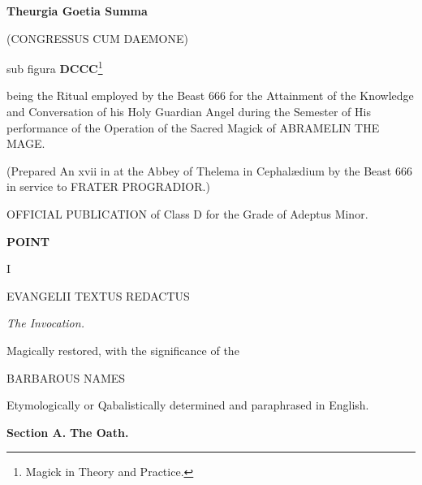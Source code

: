
{\centering
  \large
  \textbf{Theurgia Goetia Summa}

  (CONGRESSUS CUM DAEMONE)

sub figura \textbf{DCCC}\footnote{Magick in Theory and Practice.}
\par}

being the Ritual employed by the Beast 666 for the Attainment of the Knowledge and Conversation of his Holy Guardian Angel during the Semester of His performance of the Operation of the Sacred Magick of ABRAMELIN THE MAGE.

(Prepared An xvii \Sun{} in \virgo{} at the Abbey of Thelema in Cephal\ae{}dium by the Beast 666 in service to FRATER PROGRADIOR.)

OFFICIAL PUBLICATION of \Argentium{} Class D for the Grade of Adeptus Minor.

\clearpage
{\centering
\textbf{POINT}

I

EVANGELII TEXTUS REDACTUS
\par}

\textit{The Invocation.}

Magically restored, with the significance of the

{\centering
  BARBAROUS NAMES
\par}

Etymologically or Qabalistically determined and paraphrased in English.

\textbf{Section A.} \hfill \textbf{The Oath.}

